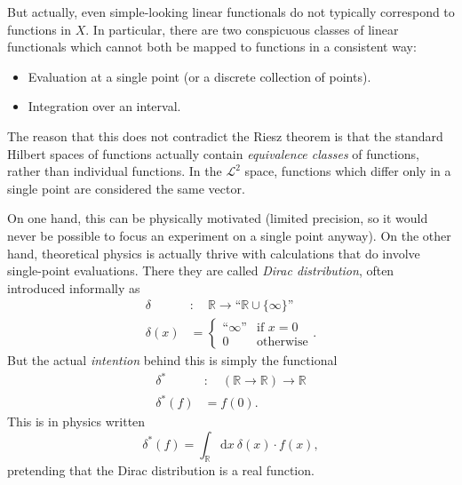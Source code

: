 \documentclass[sigplan,review,anonymous]{acmart}\settopmatter{printfolios=true,printccs=false,printacmref=false}
\theoremstyle{acmplain}
\theoremstyle{acmdefinition}
\begin{document}
But actually, even simple-looking linear functionals do not typically correspond to functions in $X$. In particular, there are two conspicuous classes of linear functionals which cannot both be mapped to functions in a consistent way:
\begin{itemize}
 \item Evaluation at a single point (or a discrete collection of points). %
 \item Integration over an interval.  %
\end{itemize}
The reason that this does not contradict the Riesz theorem is that the standard Hilbert spaces of functions actually contain \emph{equivalence classes} of functions, rather than individual functions. In the $\mathcal{L}^2$ space, functions which differ only in a single point are considered the same vector.

On one hand, this can be physically motivated (limited precision, so it would never be possible to focus an experiment on a single point anyway).
On the other hand, theoretical physics is actually thrive with calculations that do involve single-point evaluations. There they are called \emph{Dirac distribution}, often introduced informally as
\begin{align*}
  \delta &:\quad \mathbb{R} \to “\mathbb{R}\cup\{\infty\}”
 \\
  \delta(x) &= \begin{cases} “\infty” & \text{if }x=0
                          \\ 0        & \text{otherwise} \end{cases}.
\end{align*}
But the actual \emph{intention} behind this is simply the functional
\begin{align*}
  \delta^\ast &:\quad (\mathbb{R} \to \mathbb{R}) \to \mathbb{R}
 \\
  \delta^\ast(f) &= f(0).
\end{align*}
This is in physics written
\[
  \delta^\ast(f) = \int_\mathbb{R}\!\mathrm{d}x\: \delta(x)\cdot f(x),
\]
pretending that the Dirac distribution is a real function.
\end{document}
